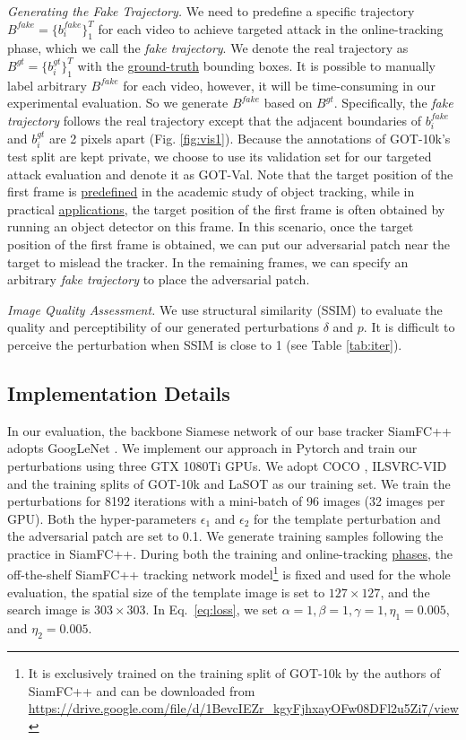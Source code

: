 \documentclass[journal]{IEEEtran}
\begin{document}
\textit{Generating the Fake Trajectory.} We need to predefine a specific trajectory $B^{fake}=\{b^{fake}_i\}_1^{T}$ for each video to achieve targeted attack in the online-tracking phase, which we call the \textit{fake trajectory}. We denote the real trajectory as $B^{gt}=\{b^{gt}_i\}_1^T$ with the \uline{ground-truth} bounding boxes. It is possible to manually label arbitrary $B^{fake}$ for each video, however, it will be time-consuming in our experimental evaluation. So we generate $B^{fake}$ based on $B^{gt}$. Specifically, the \textit{fake trajectory} follows the real trajectory except that the adjacent boundaries of $b^{fake}_i$ and $b^{gt}_i$ are 2 pixels apart (Fig. \ref{fig:vis1}). Because the annotations of GOT-10k's test split are kept private, we choose to use its validation set for our targeted attack evaluation and denote it as GOT-Val. Note that the target position of the first frame is \uline{predefined} in the academic study of object tracking, while in practical \uline{applications}, the target position of the first frame is often obtained by running an object detector on this frame. In this scenario, once the target position of the first frame is obtained, we can put our adversarial patch near the target to mislead the tracker. In the remaining frames, we can specify an arbitrary \textit{fake trajectory} to place the adversarial patch.

\textit{Image Quality Assessment.} We use structural similarity (SSIM) \cite{SSIM} to evaluate the quality and perceptibility of our generated perturbations $\delta$ and $p$. It is difficult to perceive the perturbation when SSIM is close to 1 (see Table \ref{tab:iter}).

\subsection{Implementation Details}

In our evaluation, the backbone Siamese network of our base tracker SiamFC++ \cite{SiamFC++} adopts GoogLeNet \cite{GoogLeNet}. We implement our approach in Pytorch and train our perturbations using three GTX 1080Ti GPUs. We adopt COCO \cite{COCO}, ILSVRC-VID \cite{VID} and the training splits of GOT-10k \cite{GOT-10k} and LaSOT \cite{LaSOT} as our training set. We train the perturbations for 8192 iterations with a mini-batch of 96 images (32 images per GPU). Both the hyper-parameters $\epsilon_1$ and $\epsilon_2$ for the template perturbation and the adversarial patch are set to 0.1. We generate training samples following the practice in SiamFC++. During both the training and online-tracking \uline{phases}, the off-the-shelf SiamFC++ tracking network model\footnote{It is exclusively trained on the training split of GOT-10k by the authors of SiamFC++ and can be downloaded from \url{https://drive.google.com/file/d/1BevcIEZr_kgyFjhxayOFw08DFl2u5Zi7/view}} is fixed and used for the whole evaluation, the spatial size of the template image is set to $127\times 127$, and the search image is $303\times 303$. In Eq.~\eqref{eq:loss}, we set $\alpha=1, \beta=1, \gamma=1, \eta_1=0.005$, and $\eta_2=0.005$.
\end{document}

